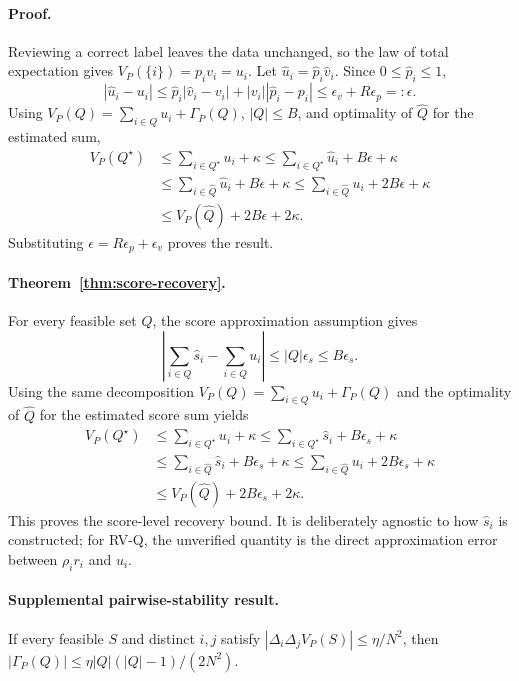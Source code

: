 \documentclass{article}
\begin{document}
\paragraph{Proof.}
Reviewing a correct label leaves the data unchanged, so the law of total expectation gives $V_P(\{i\})=p_iv_i=u_i$. Let $\hat u_i=\hat p_i\hat v_i$. Since $0\leq\hat p_i\leq1$,
\begin{equation}
 |\hat u_i-u_i|\leq \hat p_i|\hat v_i-v_i|+|v_i||\hat p_i-p_i|
 \leq\epsilon_v+R\epsilon_p=: \epsilon.
\end{equation}
Using $V_P(Q)=\sum_{i\in Q}u_i+\Gamma_P(Q)$, $|Q|\leq B$, and optimality of $\widehat Q$ for the estimated sum,
\begin{align}
V_P(Q^\star)
&\leq\sum_{i\in Q^\star}u_i+\kappa
\leq\sum_{i\in Q^\star}\hat u_i+B\epsilon+\kappa\\
&\leq\sum_{i\in\widehat Q}\hat u_i+B\epsilon+\kappa
\leq\sum_{i\in\widehat Q}u_i+2B\epsilon+\kappa\\
&\leq V_P(\widehat Q)+2B\epsilon+2\kappa.
\end{align}
Substituting $\epsilon=R\epsilon_p+\epsilon_v$ proves the result.

\paragraph{Theorem~\ref{thm:score-recovery}.}
For every feasible set $Q$, the score approximation assumption gives
\[
\left|\sum_{i\in Q}\hat s_i-\sum_{i\in Q}u_i\right|
\leq |Q|\epsilon_s\leq B\epsilon_s.
\]
Using the same decomposition
$V_P(Q)=\sum_{i\in Q}u_i+\Gamma_P(Q)$ and the optimality of
$\widehat Q$ for the estimated score sum yields
\begin{align*}
V_P(Q^\star)
&\leq \sum_{i\in Q^\star}u_i+\kappa
\leq \sum_{i\in Q^\star}\hat s_i+B\epsilon_s+\kappa\\
&\leq \sum_{i\in\widehat Q}\hat s_i+B\epsilon_s+\kappa
\leq \sum_{i\in\widehat Q}u_i+2B\epsilon_s+\kappa\\
&\leq V_P(\widehat Q)+2B\epsilon_s+2\kappa.
\end{align*}
This proves the score-level recovery bound. It is deliberately agnostic to
how $\hat s_i$ is constructed; for RV-Q, the unverified quantity is the
direct approximation error between $\rho_i r_i$ and $u_i$.

\paragraph{Supplemental pairwise-stability result.}\label{prop:pairwise}
If every feasible $S$ and distinct $i,j$ satisfy
$|\Delta_i\Delta_j V_P(S)|\leq\eta/N^2$, then
$|\Gamma_P(Q)|\leq\eta|Q|(|Q|-1)/(2N^2)$.
\end{document}
